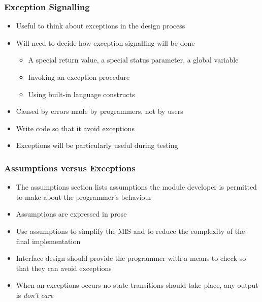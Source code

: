 \documentclass[t,12pt,numbers,fleqn,handout]{beamer}
\begin{document}
\begin{frame}

\frametitle{Exception Signalling}

\begin{itemize}
\item Useful to think about exceptions in the design process
\item Will need to decide how exception signalling will be done
\begin{itemize}
\item A special return value, a special status parameter, a global variable
\item Invoking an exception procedure
\item Using built-in language constructs
\end{itemize}
\item Caused by errors made by programmers, not by users
\item Write code so that it avoid exceptions
\item Exceptions will be particularly useful during testing
\end{itemize}

\end{frame}


\begin{frame}

\frametitle{Assumptions versus Exceptions}

\begin{itemize}
\item The assumptions section lists assumptions the module developer is permitted to make about the programmer's behaviour
\item Assumptions are expressed in prose
\item Use assumptions to simplify the MIS and to reduce the complexity of the final implementation
\item Interface design should provide the programmer with a means to check so that they can avoid exceptions
\item When an exceptions occurs no state transitions should take place, any output is {\it don't care}
\end{itemize}

\end{frame}

\end{document}
